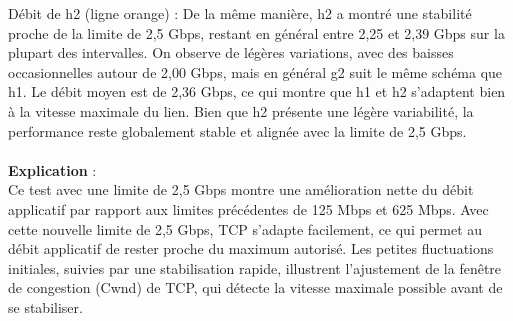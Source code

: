 Débit de h2 (ligne orange) : De la même manière, h2 a montré une stabilité proche de la limite de 2,5 Gbps, restant en général entre 2,25 et 2,39 Gbps sur la plupart des intervalles. On observe de légères variations, avec des baisses occasionnelles autour de 2,00 Gbps, mais en général g2 suit le même schéma que h1. Le débit moyen est de 2,36 Gbps, ce qui montre que h1 et h2 s’adaptent bien à la vitesse maximale du lien. Bien que h2 présente une légère variabilité, la performance reste globalement stable et alignée avec la limite de 2,5 Gbps.
\\
\\
\textbf{Explication} :\\
Ce test avec une limite de 2,5 Gbps montre une amélioration nette du débit applicatif par rapport aux limites précédentes de 125 Mbps et 625 Mbps. Avec cette nouvelle limite de 2,5 Gbps, TCP s’adapte facilement, ce qui permet au débit applicatif de rester proche du maximum autorisé. Les petites fluctuations initiales, suivies par une stabilisation rapide, illustrent l’ajustement de la fenêtre de congestion (Cwnd) de TCP, qui détecte la vitesse maximale possible avant de se stabiliser.

